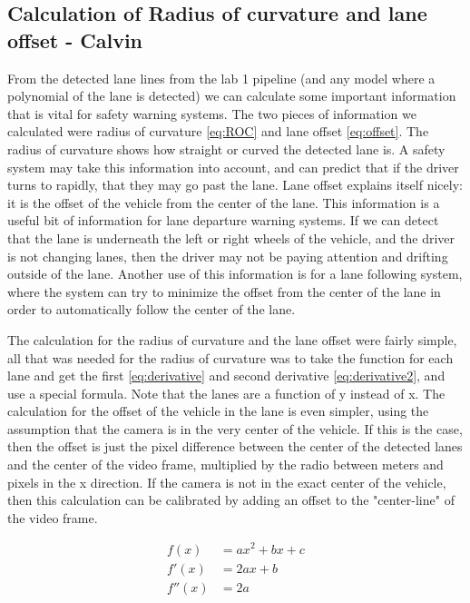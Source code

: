 \documentclass[twoside,twocolumn]{article}
\begin{document}
\subsection{Calculation of Radius of curvature and lane offset - Calvin}
\par From the detected lane lines from the lab 1 pipeline (and any model where a polynomial of the lane is detected) we can calculate some important information that is vital for safety warning systems. The two pieces of information we calculated were radius of curvature \ref{eq:ROC} and lane offset \ref{eq:offset}. The radius of curvature shows how straight or curved the detected lane is. A safety system may take this information into account, and can predict that if the driver turns to rapidly, that they may go past the lane. Lane offset explains itself nicely: it is the offset of the vehicle from the center of the lane. This information is a useful bit of information for lane departure warning systems. If we can detect that the lane is underneath the left or right wheels of the vehicle, and the driver is not changing lanes, then the driver may not be paying attention and drifting outside of the lane. Another use of this information is for a lane following system, where the system can try to minimize the offset from the center of the lane in order to automatically follow the center of the lane.
\par The calculation for the radius of curvature and the lane offset were fairly simple, all that was needed for the radius of curvature was to take the function for each lane and get the first \ref{eq:derivative} and second derivative \ref{eq:derivative2}, and use a special formula. Note that the lanes are a function of y instead of x. The calculation for the offset of the vehicle in the lane is even simpler, using the assumption that the camera is in the very center of the vehicle. If this is the case, then the offset is just the pixel difference between the center of the detected lanes and the center of the video frame, multiplied by the radio between meters and pixels in the x direction. If the camera is not in the exact center of the vehicle, then this calculation can be calibrated by adding an offset to the "center-line" of the video frame.

\begin{subequations}
\begin{align}
f(x) &= ax^2 + bx + c \\
f'(x) &= 2ax + b \label{eq:derivative} \\
f''(x) &= 2a \label{eq:derivative2}
\end{align}
\end{subequations}
\end{document}
